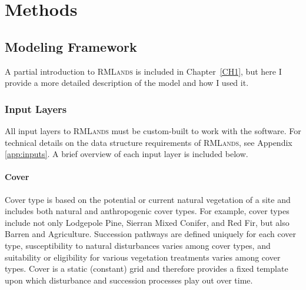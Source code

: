 
\section{Methods}
\label{sec:hrvmethods}


\subsection{Modeling Framework}
\label{sec:modelframe}

A partial introduction to \textsc{RMLands} is included in Chapter~\ref{CH1}, but here I provide a more detailed description of the model and how I used it. 

\subsubsection*{Input Layers}
\label{subsec:hrvinputlayers}

All input layers to \textsc{RMLands} must be custom-built to work with the software. For technical details on the data structure requirements of \textsc{RMLands}, see Appendix \ref{app:inputs}. A brief overview of each input layer is included below.

\paragraph*{Cover} Cover type is based on the potential or current natural vegetation of a site and includes both natural and anthropogenic cover types. For example, cover types include not only Lodgepole Pine, Sierran Mixed Conifer, and Red Fir, but also Barren and Agriculture. Succession pathways are defined uniquely for each cover type, susceptibility to natural disturbances varies among cover types, and suitability or eligibility for various vegetation treatments varies among cover types. Cover is a static (constant) grid and therefore provides a fixed template upon which disturbance and succession processes play out over time. 

